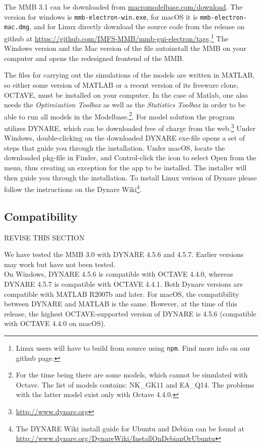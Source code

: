 The MMB 3.1 can be downloaded from \url{macromodelbase.com/download}. The version for windows is \texttt{mmb-electron-win.exe}, for macOS it is \texttt{mmb-electron-mac.dmg}, and for Linux directly download the source code from the release on github at
\url{https://github.com/IMFS-MMB/mmb-gui-electron/tags}.\footnote{Linux users will have to build from source using \texttt{npm}. Find more info on our github page.}
The Windows version and the Mac version of the file autoinstall the MMB on your computer and opens the redesigned frontend of the MMB. 

The files for carrying out the simulations of the models are written in MATLAB, so either some version of MATLAB or a recent version of its freeware clone, OCTAVE, must be installed on your computer. In the case of Matlab, one also needs the \textit{Optimization Toolbox} as well as the \textit{Statistics Toolbox} in order to be able to run all models in the Modelbase.\footnote{For the time being there are some models, which cannot be simulated with Octave. The list of models contains: NK\_GK11 and EA\_Q14. The problems with the latter model exist only with Octave 4.4.0.}.
For model solution the program utilizes DYNARE, which can be downloaded free of charge from the web.\footnote{\url{http://www.dynare.org}} Under Windows, double-clicking on the downloaded DYNARE exe-file opens a set of steps that guide you through the installation. Under macOS, locate the downloaded pkg-file in Finder, and Control-click the icon to select Open from the menu, thus creating an exception for the app to be installed. The installer will then guide you through the installation. To install Linux verison of Dynare please follow the instructions on the Dynare Wiki\footnote{The DYNARE Wiki install guide for Ubuntu and Debian can be found at \url{http://www.dynare.org/DynareWiki/InstallOnDebianOrUbuntu}}.

\subsection*{Compatibility}

REVISE THIS SECTION

We have tested the MMB 3.0 with DYNARE 4.5.6 and 4.5.7. Earlier versions may work but have not been tested.\\
On Windows, DYNARE 4.5.6 is compatible with OCTAVE 4.4.0, whereas DYNARE 4.5.7 is compatible with OCTAVE 4.4.1. Both Dynare versions are compatible with  MATLAB R2007b and later. For macOS, the compatibility between DYNARE and MATLAB is the same. However, at the time of this release, the highest OCTAVE-supported version of DYNARE is 4.5.6 (compatible with OCTAVE 4.4.0 on macOS).\\


